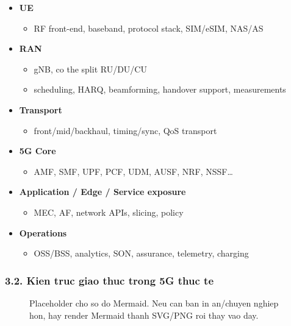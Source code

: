 \documentclass[
  vietnamese,
  a4paper,
  11pt]{article}
\providecommand{\tightlist}{%
  \setlength{\itemsep}{0pt}\setlength{\parskip}{0pt}}
\begin{document}
\begin{itemize}
\tightlist
\item
  \textbf{UE}

  \begin{itemize}
  \tightlist
  \item
    RF front-end, baseband, protocol stack, SIM/eSIM, NAS/AS
  \end{itemize}
\item
  \textbf{RAN}

  \begin{itemize}
  \tightlist
  \item
    gNB, co the split RU/DU/CU
  \item
    scheduling, HARQ, beamforming, handover support, measurements
  \end{itemize}
\item
  \textbf{Transport}

  \begin{itemize}
  \tightlist
  \item
    front/mid/backhaul, timing/sync, QoS transport
  \end{itemize}
\item
  \textbf{5G Core}

  \begin{itemize}
  \tightlist
  \item
    AMF, SMF, UPF, PCF, UDM, AUSF, NRF, NSSF\ldots{}
  \end{itemize}
\item
  \textbf{Application / Edge / Service exposure}

  \begin{itemize}
  \tightlist
  \item
    MEC, AF, network APIs, slicing, policy
  \end{itemize}
\item
  \textbf{Operations}

  \begin{itemize}
  \tightlist
  \item
    OSS/BSS, analytics, SON, assurance, telemetry, charging
  \end{itemize}
\end{itemize}

\subsubsection{3.2. Kien truc giao thuc trong 5G thuc
te}\label{kien-truc-giao-thuc-trong-5g-thuc-te}

\begin{figure}[H]
\centering
{}
\caption{Placeholder cho so do Mermaid. Neu can ban in an/chuyen nghiep hon, hay render Mermaid thanh SVG/PNG roi thay vao day.}
\end{figure}
\end{document}
